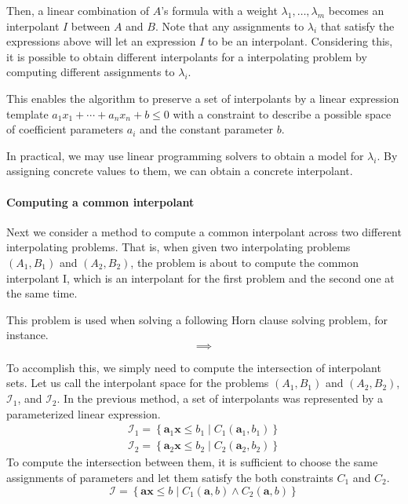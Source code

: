 \documentclass[master,final,12pt]{iscs-thesis}
\begin{document}
Then, a linear combination of $A$'s formula with a weight $\lambda_1,
\ldots, \lambda_m$ becomes an interpolant $I$ between $A$ and $B$.
Note that any assignments to $\lambda_i$ that satisfy the expressions
above will let an expression $I$ to be an interpolant.  Considering
this, it is possible to obtain different interpolants for a
interpolating problem by computing different assignments to
$\lambda_i$.

This enables the algorithm to preserve a set of interpolants by a
linear expression template $a_1 x_1 + \cdots + a_n x_n + b \leq 0$
with a constraint to describe a possible space of coefficient
parameters $a_i$ and the constant parameter $b$.

In practical, we may use linear programming solvers to obtain a model
for $\lambda_i$.  By assigning concrete values to them, we can obtain
a concrete interpolant.


\paragraph{Computing a common interpolant}
Next we consider a method to compute a common interpolant across two
different interpolating problems.  That is, when given two
interpolating problems $\left(A_1, B_1 \right)$ and $\left(A_2, B_2
\right)$, the problem is about to compute the common interpolant I,
which is an interpolant for the first problem and the second one at
the same time.

This problem is used when solving a following Horn clause solving
problem, for instance.
\[
\implies
\]

To accomplish this, we simply need to compute the intersection of
interpolant sets.  Let us call the interpolant space for the problems
$\left(A_1, B_1 \right)$ and $\left(A_2, B_2 \right)$,
$\mathcal{I}_1$, and $\mathcal{I}_2$.  In the previous method, a set
of interpolants was represented by a parameterized linear expression.
\begin{align*}
\mathcal{I}_1 = \left\lbrace \mathbf{a}_1 \mathbf{x} \leq b_1 \mid
C_1 (\mathbf{a}_1, b_1 ) \right\rbrace \\
\mathcal{I}_2 = \left\lbrace \mathbf{a}_2 \mathbf{x} \leq b_2 \mid
C_2 (\mathbf{a}_2, b_2 ) \right\rbrace
\end{align*}
To compute the intersection between them, it is sufficient to choose
the same assignments of parameters and let them satisfy the both
constraints $C_1$ and $C_2$.
\[ \mathcal{I} = \left\lbrace \mathbf{a} \mathbf{x} \leq b \mid
C_1(\mathbf{a}, b) \wedge C_2(\mathbf{a}, b) \right\rbrace \]
\end{document}
